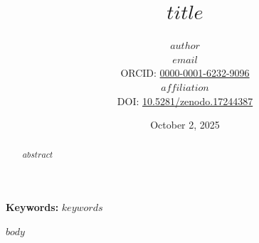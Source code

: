 \documentclass[11pt,letterpaper]{article}
\title{$title$}
\author{
    $author$ \\
    \texttt{$email$} \\
    ORCID: \href{https://orcid.org/0000-0001-6232-9096}{0000-0001-6232-9096} \\
    $affiliation$ \\
    \vspace{0.5em}
    DOI: \href{https://doi.org/10.5281/zenodo.17244387}{10.5281/zenodo.17244387}
}
\date{October 2, 2025}
\numberwithin{equation}{section}
\begin{document}
\maketitle
\thispagestyle{empty}

\begin{abstract}
$abstract$
\end{abstract}

\noindent\textbf{Keywords:} $keywords$

\vspace{1em}

\newpage
\tableofcontents
\newpage

$body$
\end{document}
